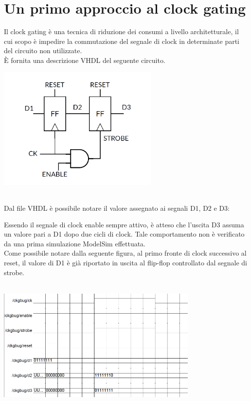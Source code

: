 \documentclass[11pt,  english, makeidx, a4paper, titlepage, oneside]{book}
\newenvironment{listato}{\footnotesize} {\normalsize }
\begin{document}
\section{Un primo approccio al clock gating}
Il clock gating è una tecnica di riduzione dei consumi a livello architetturale, il cui scopo è impedire la commutazione del segnale di clock in determinate parti del circuito non utilizzate.
\\
È fornita una descrizione VHDL del seguente circuito.
\\
\centerline{\includegraphics[width=8cm]{./img/Lab_3/circuito_clk_bug.png}}
\\
Dal file VHDL è possibile notare il valore assegnato ai segnali D1, D2 e D3:
\begin{center}
\begin{listato}
	\centerline{}
\end{listato}
\end{center}
Essendo il segnale di clock enable sempre attivo, è atteso che l'uscita D3 assuma un valore pari a D1 dopo due cicli di clock. Tale comportamento non è verificato da una prima simulazione ModelSim effettuata.
\\
Come possibile notare dalla seguente figura, al primo fronte di clock successivo al reset, il valore di D1 è già riportato in uscita al flip-flop controllato dal segnale di strobe.
\\\\
\centerline{\includegraphics[width=10cm]{./img/Lab_3/clk_bug.png}}
\end{document}
